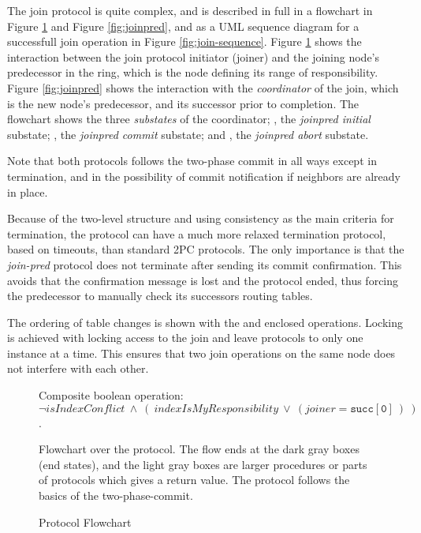 The join protocol is quite complex, and is described in full in a flowchart in
 Figure \ref{fig:join} and Figure \ref{fig:joinpred}, and as a UML sequence diagram
 for a successfull join operation in Figure \ref{fig:join-sequence}.
Figure \ref{fig:join} shows the interaction between the join protocol initiator (joiner)
 and the joining node's predecessor in the ring, which is the node defining its range
 of responsibility.
Figure \ref{fig:joinpred} shows the interaction with the \emph{coordinator} of the join,
 which is the new node's predecessor, and its successor prior to completion. The flowchart
 shows the three \emph{substates} of the coordinator; , the \emph{join\-pred
 initial} substate; , the \emph{join\-pred commit} substate; and
 , the \emph{join\-pred abort} substate.

Note that both protocols follows the two-phase commit in all ways except in termination,
 and in the possibility of  commit notification if neighbors are already in
 place.

Because of the two-level structure and using consistency as the main criteria for
 termination, the protocol can have a much more relaxed termination protocol, based on
 timeouts, than standard 2PC protocols. The only importance is that the \emph{join-pred}
 protocol does not terminate after sending its commit confirmation.
 This avoids that the confirmation message is lost and the protocol ended,
 thus forcing the predecessor to manually check its successors routing tables.

The ordering of table changes is shown with the  and  enclosed
 operations. Locking is achieved with locking access to the join and leave protocols
 to only one instance at a time. This ensures that two join operations on the same
 node does not interfere with each other.

\begin{figure}[htp]%
\centering
{}
\parbox{.9\linewidth}{
\begin{enumerate}
{ \small\item Composite boolean operation:\\
  $\neg isIndexConflict\ \wedge\ (\ indexIsMyResponsibility\ \vee\ (joiner = \mathtt{succ[0]}\ )\ )$. }
\end{enumerate}
  Flowchart over the  protocol. The flow ends at the dark gray boxes
   (end states), and the light gray boxes are larger procedures or parts of protocols
   which gives a return value. The protocol follows the basics of the
   two-phase-commit\cite{oszu-99-podds}.}
\caption{ Protocol Flowchart}
\label{fig:join}
\end{figure}

